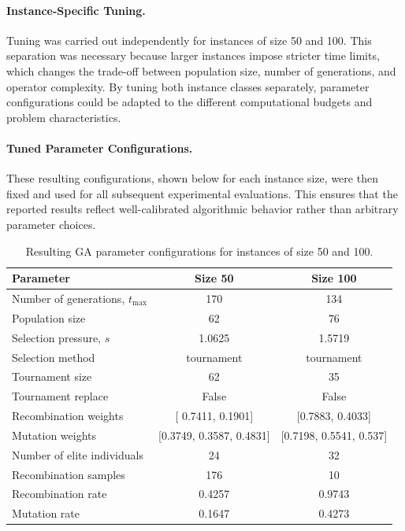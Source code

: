 \documentclass[12pt]{article}
\begin{document}
\paragraph{Instance-Specific Tuning.}
Tuning was carried out independently for instances of size 50 and 100. This separation was necessary because larger instances impose stricter time limits, which changes the trade-off between population size, number of generations, and operator complexity. By tuning both instance classes separately, parameter configurations could be adapted to the different computational budgets and problem characteristics.

\paragraph{Tuned Parameter Configurations.}
These resulting configurations, shown below for each instance size, were then fixed and used for all subsequent experimental evaluations. This ensures that the reported results reflect well-calibrated algorithmic behavior rather than arbitrary parameter choices.



\begin{table}[H]
    \centering
    \caption{Resulting GA parameter configurations for instances of size 50 and 100.}
    \begin{tabular}{lcc}
        \toprule
        \textbf{Parameter} & \textbf{Size 50} & \textbf{Size 100} \\
        \midrule
        Number of generations, $t_{\max}$ & 170 & 134 \\
        Population size & 62 & 76 \\
        Selection pressure, $s$ & 1.0625 & 1.5719 \\
        Selection method & tournament & tournament \\
        Tournament size & 62 & 35 \\
        Tournament replace & False & False \\
        Recombination weights & [ 0.7411,  0.1901] & [0.7883, 0.4033] \\
        Mutation weights & [0.3749, 0.3587, 0.4831] & [0.7198, 0.5541, 0.537] \\
        Number of elite individuals & 24 & 32 \\
        Recombination samples & 176 & 10 \\
        Recombination rate & 0.4257 & 0.9743 \\
        Mutation rate & 0.1647 & 0.4273 \\
        \bottomrule
    \end{tabular}
    \label{tab:ga_parameters}
\end{table}
\end{document}
